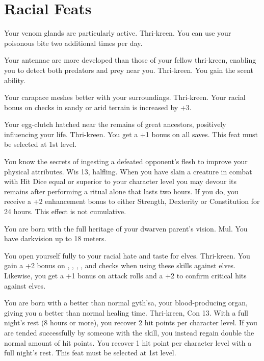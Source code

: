 \section{Racial Feats}

{Your venom glands are particularly active.}
{Thri-kreen.}
{You can use your poisonous bite two additional times per day.}
{}{}

{Your antennae are more developed than those of your fellow thri-kreen, enabling you to detect both predators and prey near you.}
{Thri-kreen.}
{You gain the scent ability.}
{}{}

{Your carapace meshes better with your surroundings.}
{Thri-kreen.}
{Your racial bonus on  checks in sandy or arid terrain is increased by +3.}
{}{}

{Your egg-clutch hatched near the remains of great ancestors, positively influencing your life.}
{Thri-kreen.}
{You get a +1 bonus on all saves.}
{}
{This feat must be selected at 1st level.}

{You know the secrets of ingesting a defeated opponent's flesh to improve your physical attributes.}
{Wis 13, halfling.}
{When you have slain a creature in combat with Hit Dice equal or superior to your character level you may devour its remains after performing a ritual alone that lasts two hours. If you do, you receive a +2 enhancement bonus to either Strength, Dexterity or Constitution for 24 hours. This effect is not cumulative.}
{}{}

{You are born with the full heritage of your dwarven parent's vision.}
{Mul.}
{You have darkvision up to 18 meters.}
{}{}

{You open yourself fully to your racial hate and taste for elves.}
{Thri-kreen.}
{You gain a +2 bonus on , , , , and  checks when using these skills against elves. Likewise, you get a +1 bonus on attack rolls and a +2 to confirm critical hits against elves.}
{}{}

{You are born with a better than normal gyth'sa, your blood-producing organ, giving you a better than normal healing time.}
{Thri-kreen, Con 13.}
{With a full night's rest (8 hours or more), you recover 2 hit points per character level. If you are tended successfully by someone with the  skill, you instead regain double the normal amount of hit points.}
{You recover 1 hit point per character level with a full night's rest.}
{This feat must be selected at 1st level.}


